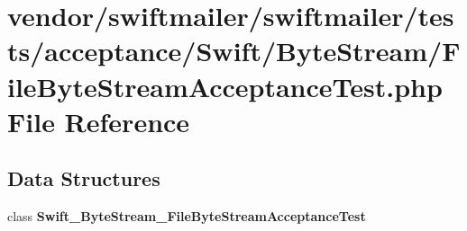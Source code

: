 \section{vendor/swiftmailer/swiftmailer/tests/acceptance/\+Swift/\+Byte\+Stream/\+File\+Byte\+Stream\+Acceptance\+Test.php File Reference}
\label{_file_byte_stream_acceptance_test_8php}
\subsection*{Data Structures}
\begin{DoxyCompactItemize}
\item 
class {\bf Swift\+\_\+\+Byte\+Stream\+\_\+\+File\+Byte\+Stream\+Acceptance\+Test}
\end{DoxyCompactItemize}
